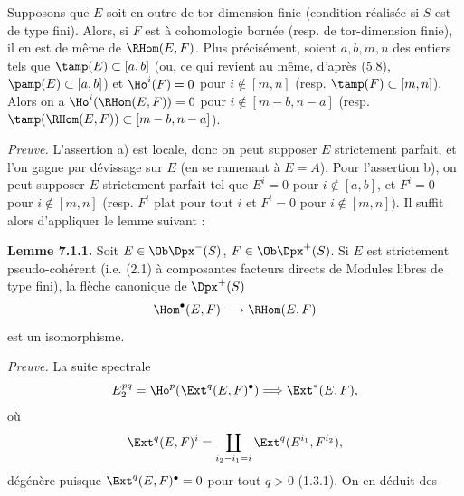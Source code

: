 Supposons que \(E\) soit en outre de tor-dimension finie (condition réalisée si \(S\) est de type fini). Alors, si \(F\) est à cohomologie bornée (resp. de tor-dimension finie), il en est de même de \(\RHom(E,F)\). Plus précisément, soient \(a,b,m,n\) des entiers tels que \(\tamp(E)\subset[a,b]\) (ou, ce qui revient au même, d'après (5.8), \(\pamp(E)\subset[a,b]\)) et \(\Ho^i(F)=0\) pour \(i\notin[m,n]\) (resp. \(\tamp(F)\subset[m,n]\)). Alors on a \(\Ho^i(\RHom(E,F))=0\) pour \(i\notin[m-b,n-a]\) (resp. \(\tamp(\RHom(E,F))\subset[m-b,n-a]\)).

\emph{Preuve.} L'assertion a) est locale, donc on peut supposer \(E\) strictement parfait, et l'on gagne par dévissage sur \(E\) (en se ramenant à \(E=A\)). Pour l'assertion b), on peut supposer \(E\) strictement parfait tel que \(E^i=0\) pour \(i\notin[a,b]\), et \(F^i=0\) pour \(i\notin[m,n]\) (resp. \(F^i\) plat pour tout \(i\) et \(F^i=0\) pour \(i\notin[m,n]\)). Il suffit alors d'appliquer le lemme suivant :

\textbf{Lemme 7.1.1.} Soit \(E\in\Ob\Dpx^-(S)\), \(F\in\Ob\Dpx^+(S)\). Si \(E\) est strictement pseudo-cohérent (i.e. (2.1) à composantes facteurs directs de Modules libres de type fini), la flèche canonique de \(\Dpx^+(S)\)
\[
  \Hom^\bullet(E,F)\longrightarrow\RHom(E,F)
\]
est un isomorphisme.

\emph{Preuve.} La suite spectrale
\[
  E_2^{pq}=\Ho^p(\Ext^q(E,F)^\bullet)\Longrightarrow \Ext^*(E,F),
\]
où
\[
  \Ext^q(E,F)^i=\coprod_{i_2-i_1=i}\Ext^q(E^{i_1},F^{i_2}),
\]
dégénère puisque \(\Ext^q(E,F)^\bullet=0\) pour tout \(q>0\) (1.3.1). On en déduit des
